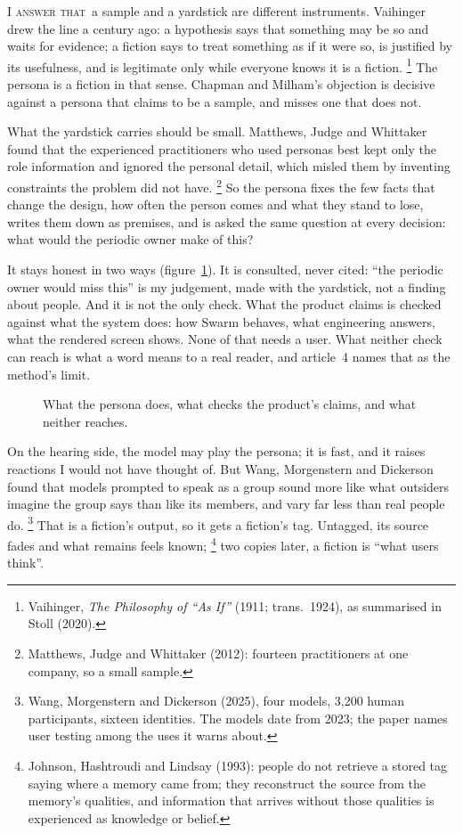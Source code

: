 \documentclass[11pt,a4paper]{article}
\newcounter{art}
\newcommand{\Respondeo}{\par\vspace{1.5mm}\noindent\textsc{I answer that}\ }
\newcommand{\Fig}[3]{%
  \begin{figure}[tbp]\centering #1 \caption{#2}\label{#3}\end{figure}}
\begin{document}
\Respondeo a sample and a yardstick are different instruments. Vaihinger drew the line a century ago: a hypothesis says that something may be so and waits for evidence; a fiction says to treat something as if it were so, is justified by its usefulness, and is legitimate only while everyone knows it is a fiction.%
\footnote{Vaihinger, \textit{The Philosophy of ``As If''} (1911; trans.\ 1924), as summarised in Stoll (2020).}
The persona is a fiction in that sense. Chapman and Milham's objection is decisive against a persona that claims to be a sample, and misses one that does not.

What the yardstick carries should be small. Matthews, Judge and Whittaker found that the experienced practitioners who used personas best kept only the role information and ignored the personal detail, which misled them by inventing constraints the problem did not have.%
\footnote{Matthews, Judge and Whittaker (2012): fourteen practitioners at one company, so a small sample.}
So the persona fixes the few facts that change the design, how often the person comes and what they stand to lose, writes them down as premises, and is asked the same question at every decision: what would the periodic owner make of this?

It stays honest in two ways (figure~\ref{fig:yardstick}). It is consulted, never cited: ``the periodic owner would miss this'' is my judgement, made with the yardstick, not a finding about people. And it is not the only check. What the product claims is checked against what the system does: how Swarm behaves, what engineering answers, what the rendered screen shows. None of that needs a user. What neither check can reach is what a word means to a real reader, and article~4 names that as the method's limit.

\Fig{\FigYardstick}{What the persona does, what checks the product's claims, and what neither reaches.}{fig:yardstick}

On the hearing side, the model may play the persona; it is fast, and it raises reactions I would not have thought of. But Wang, Morgenstern and Dickerson found that models prompted to speak as a group sound more like what outsiders imagine the group says than like its members, and vary far less than real people do.%
\footnote{Wang, Morgenstern and Dickerson (2025), four models, 3,200 human participants, sixteen identities. The models date from 2023; the paper names user testing among the uses it warns about.}
That is a fiction's output, so it gets a fiction's tag. Untagged, its source fades and what remains feels known;%
\footnote{Johnson, Hashtroudi and Lindsay (1993): people do not retrieve a stored tag saying where a memory came from; they reconstruct the source from the memory's qualities, and information that arrives without those qualities is experienced as knowledge or belief.}
two copies later, a fiction is ``what users think''.
\end{document}
